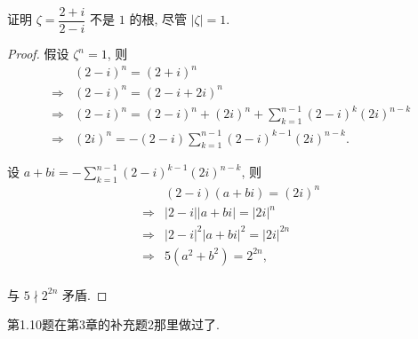 \documentclass[UTF8]{ctexart}
\begin{document}
\begin{exercise}%
    证明 $\zeta=\dfrac{2+i}{2-i}$ 不是 $1$ 的根, 尽管 $|\zeta|=1$.
\end{exercise}
\begin{proof}
    假设 $\zeta^n=1$, 则
    \begin{align*}
        & (2-i)^n=(2+i)^n \\
        \Rightarrow & (2-i)^n=(2-i+2i)^n \\
        \Rightarrow & (2-i)^n=(2-i)^n+(2i)^n+\sum\limits_{k=1}^{n-1}(2-i)^k(2i)^{n-k} \\
        \Rightarrow & (2i)^n=-(2-i)\sum\limits_{k=1}^{n-1}(2-i)^{k-1}(2i)^{n-k}.
    \end{align*}

    设 $a+bi=-\sum\limits_{k=1}^{n-1}(2-i)^{k-1}(2i)^{n-k}$, 则
    \begin{align*}
        & (2-i)(a+bi)=(2i)^n \\
        \Rightarrow & |2-i||a+bi|=|2i|^n \\
        \Rightarrow & |2-i|^2|a+bi|^2=|2i|^{2n} \\
        \Rightarrow & 5(a^2+b^2)=2^{2n}, \\
    \end{align*}

    与 $5\nmid2^{2n}$ 矛盾.
\end{proof}
第1.10题在第3章的补充题2那里做过了.
\end{document}
